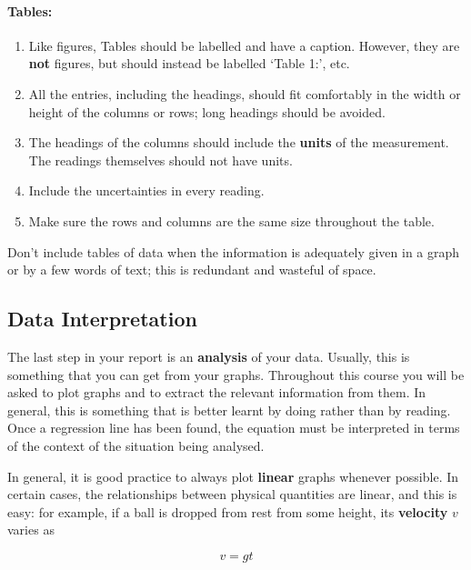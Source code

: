 \paragraph{Tables:}

\begin{enumerate}
    \item Like figures, Tables should be labelled and have a caption. However, they are \textbf{not} figures, but should instead be labelled `Table 1:', etc.
    \item All the entries, including the headings, should fit comfortably in the width or height of the columns or rows; long headings should be avoided. 
    \item The headings of the columns should include the \textbf{units} of the measurement. The readings themselves should not have units.
    \item Include the uncertainties in every reading.
    \item Make sure the rows and columns are the same size throughout the table.
\end{enumerate}

\begin{imp}
Don’t include tables of data when the information is adequately given in a graph or by a few words of text; this is redundant and wasteful of space. 
\end{imp}

\subsection{Data Interpretation}

The last step in your report is an \textbf{analysis} of your data. Usually, this is something that you can get from your graphs. Throughout this course you will be asked to plot graphs and to extract the relevant information from them. In general, this is something that is better learnt by doing rather than by reading.  Once a regression line has been found, the equation must be interpreted in terms of the context of the situation being analysed.

In general, it is good practice to always plot \textbf{linear} graphs whenever possible. In certain cases, the relationships between physical quantities are linear, and this is easy: for example, if a ball is dropped from rest from some height, its \textbf{velocity} $v$ varies as

\begin{equation*}
    v = g t
\end{equation*}

